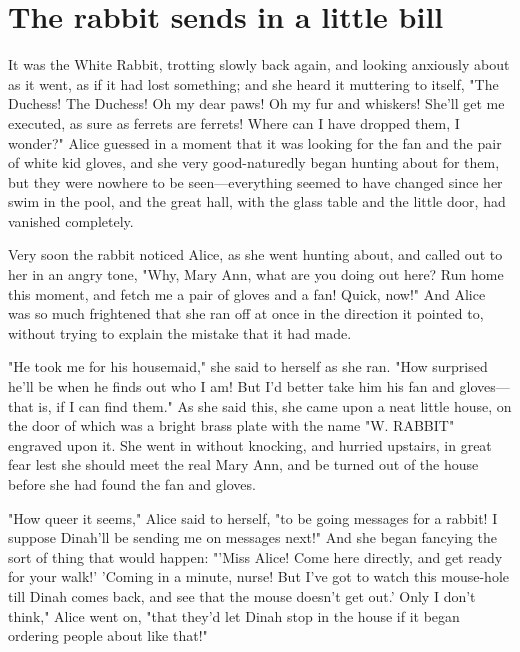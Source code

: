 \quebra\chapter*{The rabbit sends in a little bill}

It was the White Rabbit, trotting slowly back again, and looking anxiously about as it went, as if it had lost something; and she heard it muttering to itself, "The Duchess! The Duchess! Oh my dear paws! Oh my fur and whiskers! She'll get me executed, as sure as ferrets are ferrets! Where can I have dropped them, I wonder?" Alice guessed in a moment that it was looking for the fan and the pair of white kid gloves, and she very good-naturedly began hunting about for them, but they were nowhere to be seen—everything seemed to have ​changed since her swim in the pool, and the great hall, with the glass table and the little door, had vanished completely.

Very soon the rabbit noticed Alice, as she went hunting about, and called out to her in an angry tone, "Why, Mary Ann, what are you doing out here? Run home this moment, and fetch me a pair of gloves and a fan! Quick, now!" And Alice was so much frightened that she ran off at once in the direction it pointed to, without trying to explain the mistake that it had made.

"He took me for his housemaid," she said to herself as she ran. "How surprised he'll be when he finds out who I am! But I'd better take him his fan and gloves—that is, if I can find them." As she said this, she came upon a neat little house, on the door of which was a bright brass plate with the name "W. RABBIT" engraved upon it. She went in without knocking, and hurried upstairs, in great fear lest she should meet the real Mary Ann, and be ​turned out of the house before she had found the fan and gloves.

"How queer it seems," Alice said to herself, "to be going messages for a rabbit! I suppose Dinah'll be sending me on messages next!" And she began fancying the sort of thing that would happen: "'Miss Alice! Come here directly, and get ready for your walk!' 'Coming in a minute, nurse! But I've got to watch this mouse-hole till Dinah comes back, and see that the mouse doesn't get out.' Only I don't think," Alice went on, "that they'd let Dinah stop in the house if it began ordering people about like that!"

